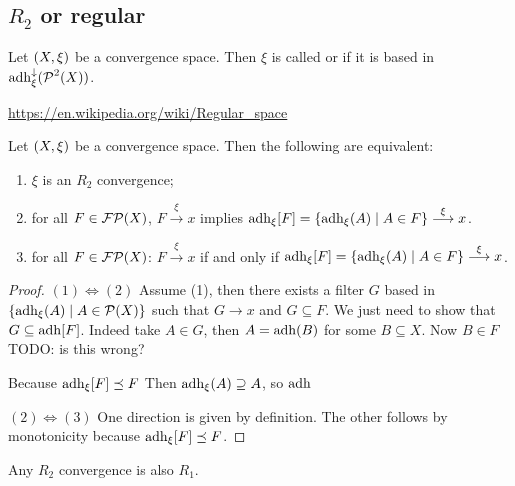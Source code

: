 \subsection{$R_2$ or regular}
\begin{definition}
Let $\left( X,\xi \right)$ be a convergence space. Then $\xi$ is called  or  if it is based in $\operatorname{adh}_\xi^{\downarrow}(\operatorname{\mathcal{P}}^2(X))$.
\end{definition}

\url{https://en.wikipedia.org/wiki/Regular_space}

\begin{proposition}
Let $\left( X,\xi \right)$ be a convergence space. Then the following are equivalent:
\begin{enumerate}
\item $\xi$ is an $R_2$ convergence;
\item for all $F\in\operatorname{\mathcal{FP}}(X)$, $F\overset{\xi}{\longrightarrow} x$ implies $\operatorname{adh}_\xi[F] = \left\{ \operatorname{adh}_\xi(A) \;\middle|\; A\in F \right\} \overset{\xi}{\longrightarrow} x$.
\item for all $F\in\operatorname{\mathcal{FP}}(X)$: $F\overset{\xi}{\longrightarrow} x$ \textup{if and only if} $\operatorname{adh}_\xi[F] = \left\{ \operatorname{adh}_\xi(A) \;\middle|\; A\in F \right\} \overset{\xi}{\longrightarrow} x$.
\end{enumerate}
\end{proposition}
\begin{proof}
$(1) \Leftrightarrow (2)$ Assume (1), then there exists a filter $G$ based in $\left\{ \operatorname{adh}_\xi(A) \;\middle|\; A\in\operatorname{\mathcal{P}}(X) \right\}$ such that $G\to x$ and $G\subseteq F$. We just need to show that $G\subseteq \operatorname{adh}[F]$. Indeed take $A\in G$, then $A = \operatorname{adh}(B)$ for some $B\subseteq X$. Now $B\in F$ TODO: is this wrong?

Because $\operatorname{adh}_\xi[F]\preceq F$ Then $\operatorname{adh}_\xi(A) \supseteq A$, so $\operatorname{adh}$ 

$(2) \Leftrightarrow (3)$ One direction is given by definition. The other follows by monotonicity because $\operatorname{adh}_\xi[F] \preceq F$.
\end{proof}

\begin{lemma}
Any $R_2$ convergence is also $R_1$.
\end{lemma}

